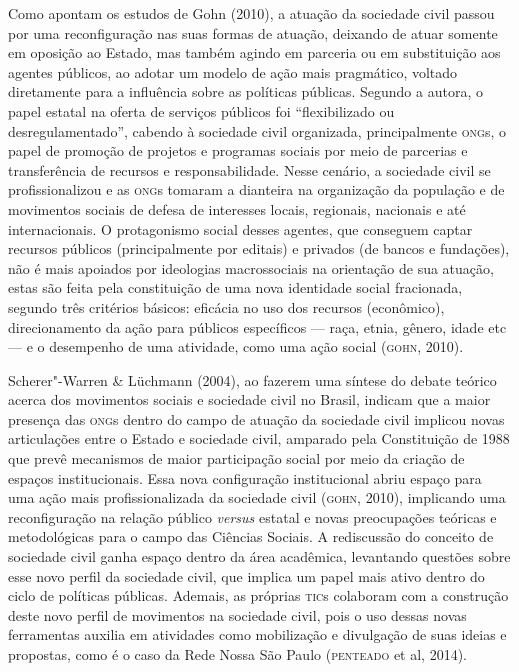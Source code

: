 Como apontam os estudos de Gohn (2010), a atuação da sociedade civil
passou por uma reconfiguração nas suas formas de atuação, deixando de
atuar somente em oposição ao Estado, mas também agindo em parceria ou em
substituição aos agentes públicos, ao adotar um modelo de ação mais
pragmático, voltado diretamente para a influência sobre as políticas
públicas. Segundo a autora, o papel estatal na oferta de serviços
públicos foi ``flexibilizado ou desregulamentado'', cabendo à sociedade
civil organizada, principalmente \textsc{ong}s, o papel de promoção de projetos e
programas sociais por meio de parcerias e transferência de recursos e
responsabilidade. Nesse cenário, a sociedade civil se profissionalizou e
as \textsc{ong}s tomaram a dianteira na organização da população e de movimentos
sociais de defesa de interesses locais, regionais, nacionais e até
internacionais. O protagonismo social desses agentes, que conseguem
captar recursos públicos (principalmente por editais) e privados (de
bancos e fundações), não é mais apoiados por ideologias macrossociais na
orientação de sua atuação, estas são feita pela constituição de uma nova
identidade social fracionada, segundo três critérios básicos: eficácia
no uso dos recursos (econômico), direcionamento da ação para públicos
específicos --- raça, etnia, gênero, idade etc --- e o desempenho de uma
atividade, como uma ação social (\textsc{gohn}, 2010).

Scherer"-Warren \& Lüchmann (2004), ao fazerem uma síntese do debate
teórico acerca dos movimentos sociais e sociedade civil no Brasil,
indicam que a maior presença das \textsc{ong}s dentro do campo de atuação da
sociedade civil implicou novas articulações entre o Estado e sociedade
civil, amparado pela Constituição de 1988 que prevê mecanismos de maior
participação social por meio da criação de espaços institucionais. Essa
nova configuração institucional abriu espaço para uma ação mais
profissionalizada da sociedade civil (\textsc{gohn}, 2010), implicando uma
reconfiguração na relação público \textit{versus} estatal e novas preocupações
teóricas e metodológicas para o campo das Ciências Sociais. A
rediscussão do conceito de sociedade civil ganha espaço dentro da área
acadêmica, levantando questões sobre esse novo perfil da sociedade
civil, que implica um papel mais ativo dentro do ciclo de políticas
públicas. Ademais, as próprias \textsc{tic}s colaboram com a construção deste
novo perfil de movimentos na sociedade civil, pois o uso dessas novas
ferramentas auxilia em atividades como mobilização e divulgação de suas
ideias e propostas, como é o caso da Rede Nossa São Paulo (\textsc{penteado} et
al, 2014).

